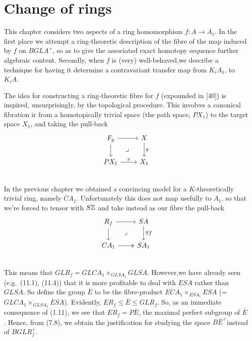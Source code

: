 \chapter{Change of rings} %
\label{cha:12change_of_rings}
This chapter considers two aspects of a ring homomorphism $f \colon   A \longrightarrow A_1$. In the first place we attempt a ring-theoretic description of the fibre of the map induced by $f$ on $BGLA^+$, so as to give the associated exact homotopy sequence further algebraic content. Secondly, when $f$ is (very) well-behaved,we describe a technique for having it determine a contravariant transfer map from $K_iA_1$, to $K_iA$.

The idea for constructing a ring-theoretic fibre for $f$ (expounded in [40]) is inspired, unsurprisingly, by the topological procedure. This involves a canonical fibration ir from a homotopically trivial space (the path space, $PX_1$) to the target space $X_1$, and taking the pull-back
\[
\begin{tikzcd}
F_g \arrow{r} \arrow{d} \arrow[dr, phantom, "\lrcorner"] & X \arrow{d}{g}\\
PX_1 \arrow{r}{\pi} & X_1 \\
\end{tikzcd}
\]
In the previous chapter we obtained a convincing model for a $K$-theoretically trivial ring, namely $CA_1$. Unfortunately this does not map usefully to $A_1$, so that we're forced to tensor with $S\mathbb{Z}$ and take instead as our fibre the pull-back
\[
\begin{tikzcd}
R_f \arrow{r} \arrow{d} \arrow[dr, phantom, "\lrcorner"] & SA \arrow{d}{Sf}\\
CA_1 \arrow[two heads]{r} & SA_1 \\
\end{tikzcd}
\]
This means that $GLR_f = GLCA_1 \times_{GLSA_1}GLSA$. However,we have already seen (e.g.\  (11.1),
(11.4)) that it is more profitable to deal with $ESA$ rather than $GLSA$. So define the group $\bar{E}$ to be the fibre-product $ECA_1\times_{ESA_1}  ESA$ (= $GLCA_1 \times_{GLSA_1} ESA$). Evidently, $ER_f \leqslant \bar{E} \leqslant GLR_f$. So, as an immediate consequence of (1.11), we see that $ER_f = P\bar{E}$, the maximal perfect subgroup of $\bar{ E}$. Hence, from (7.8), we obtain the justification for studying the space $B\bar{E}^+$instead of $BGLR_f^+$.


